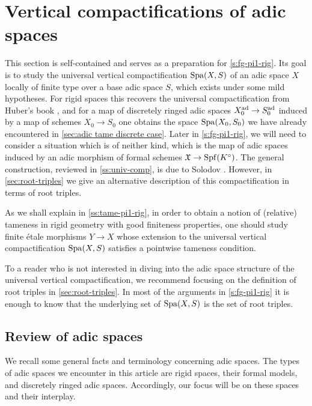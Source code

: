 \section{Vertical compactifications of adic spaces}
\label{s:compactifications}

This section is self-contained and serves as a preparation for \cref{s:fg-pi1-rig}.
Its goal is to study the universal vertical compactification $\operatorname{Spa}(X,S)$ of an adic space $X$ locally of finite type over a base adic space $S$, which exists under some mild hypotheses.
For rigid spaces this recovers the universal compactification from Huber's book \cite[\S 5.1]{HuberBook}, and for a map of discretely ringed adic spaces $X_0^{\rm ad}\to S_0^{\rm ad}$ induced by a map of schemes $X_0\to S_0$ one obtains the space $\operatorname{Spa}(X_0, S_0)$ we have already encountered in \cref{sec:adic tame discrete case}. Later in \cref{s:fg-pi1-rig}, we will need to consider a situation which is of neither kind, which is the map of adic spaces induced by an adic morphism of formal schemes ${\mathfrak{X}}\to\operatorname{Spf}(K^\circ)$.   The general construction, reviewed in \cref{ss:univ-comp}, is due to Solodov \cite{Solodov-vertical-compactification}.
However, in \cref{sec:root-triples} we give an alternative description of this compactification in terms of root triples. 

As we shall explain in \cref{ss:tame-pi1-rig}, in order to obtain a notion of (relative) tameness in rigid geometry with good finiteness properties, one should study finite \'etale morphisms $Y \to X$ whose extension to the universal vertical compactification $\operatorname{Spa}(X,S)$ satisfies a pointwise tameness condition. 

To a reader who is not interested in diving into the adic space structure of the universal vertical compactification, we recommend focusing on the definition of root triples in \cref{sec:root-triples}.
In most of the arguments in \cref{s:fg-pi1-rig} it is enough to know that the underlying set of $\operatorname{Spa}(X,S)$ is the set of root triples.


\subsection{Review of adic spaces}
\label{ss:adic-spaces}


We recall some general facts and terminology concerning adic spaces.
The types of adic spaces we encounter in this article are rigid spaces, their formal models, and discretely ringed adic spaces.
Accordingly, our focus will be on these spaces and their interplay.

